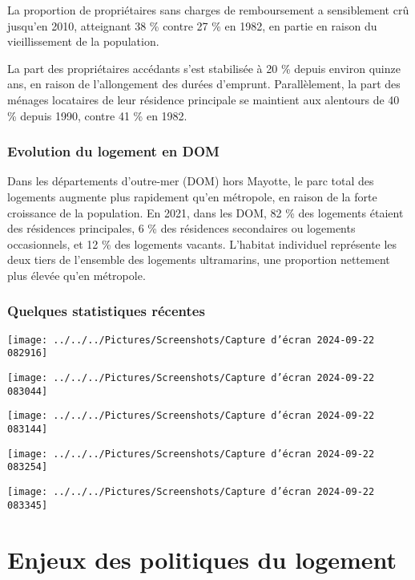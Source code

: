\documentclass[a4paper, 12pt]{report}
\begin{document}
La proportion de propriétaires sans charges de remboursement a sensiblement crû jusqu’en 2010, atteignant 38 \% contre 27 \% en 1982, en partie en raison du vieillissement de la population.
 
La part des propriétaires accédants s’est stabilisée à 20 \% depuis environ quinze ans, en raison de l’allongement des durées d’emprunt. Parallèlement, la part des ménages locataires de leur résidence principale se maintient aux alentours de 40 \% depuis 1990, contre 41 \% en 1982.

\subsubsection{Evolution du logement en DOM}

Dans les départements d’outre-mer (DOM) hors Mayotte, le parc total des logements augmente plus rapidement qu’en métropole, en raison de la forte croissance de la population. En 2021, dans les DOM, 82 \% des logements étaient des résidences principales, 6 \% des résidences secondaires ou logements occasionnels, et 12 \% des logements vacants. L’habitat individuel représente les deux tiers de l’ensemble des logements ultramarins, une proportion nettement plus élevée qu’en métropole.

\subsubsection{Quelques statistiques récentes}

\begin{center}
	\texttt{[image: ../../../Pictures/Screenshots/Capture d'écran 2024-09-22 082916]}
	
	\texttt{[image: ../../../Pictures/Screenshots/Capture d'écran 2024-09-22 083044]}
	
	\texttt{[image: ../../../Pictures/Screenshots/Capture d'écran 2024-09-22 083144]}
	
	\texttt{[image: ../../../Pictures/Screenshots/Capture d'écran 2024-09-22 083254]}
	
	\texttt{[image: ../../../Pictures/Screenshots/Capture d'écran 2024-09-22 083345]}
	
\end{center}

\section{Enjeux des politiques du logement}
\end{document}
